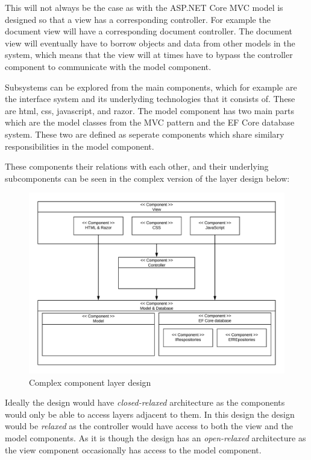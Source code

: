 This will not always be the case as with the ASP.NET Core MVC model is designed so that a view has a corresponding controller.
For example the document view will have a corresponding document controller.
The document view will eventually have to borrow objects and data from other models in the system, which means that the view will at times have to bypass the controller component to communicate with the model component.

Subsystems can be explored from the main components, which for example are the interface system and its underlyding technologies that it consists of.
These are html, css, javascript, and razor.
The model component has two main parts which are the model classes from the MVC pattern and the EF Core database system.
These two are defined as seperate components which share similary responsibilities in the model component.

These components their relations with each other, and their underlying subcomponents can be seen in the complex version of the layer design below:

\begin{figure}[H]
	\centering
	\includegraphics[width=1\textwidth]{billeder/complexcomponents.jpeg}
	\caption{Complex component layer design}
\end{figure}

Ideally the design would have \textit{closed-relaxed} architecture as the components would only be able to access layers adjacent to them.
In this design the design would be \textit{relaxed} as the controller would have access to both the view and the model components.
As it is though the design has an \textit{open-relaxed} architecture as the view component occasionally has access to the model component.


